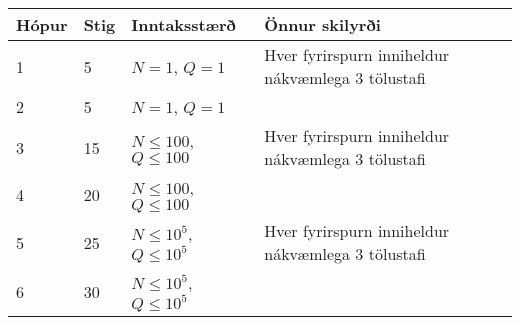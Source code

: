 \begin{tabular}{|l|l|l|l|}
\hline
Hópur & Stig & Inntaksstærð & Önnur skilyrði \\ \hline
1 & 5 & $N=1$, $Q=1$ & Hver fyrirspurn inniheldur nákvæmlega $3$ tölustafi \\ \hline
2 & 5 & $N = 1$, $Q=1$ & \\ \hline
3 & 15 & $N \leq 100$, $Q \leq 100$ & Hver fyrirspurn inniheldur nákvæmlega $3$ tölustafi \\ \hline
4 & 20 & $N \leq 100$, $Q \leq 100$ & \\ \hline
5 & 25 & $N \leq 10^5$, $Q \leq 10^5$ & Hver fyrirspurn inniheldur nákvæmlega $3$ tölustafi \\ \hline
6 & 30 & $N \leq 10^5$, $Q \leq 10^5$ & \\ \hline
\end{tabular}
